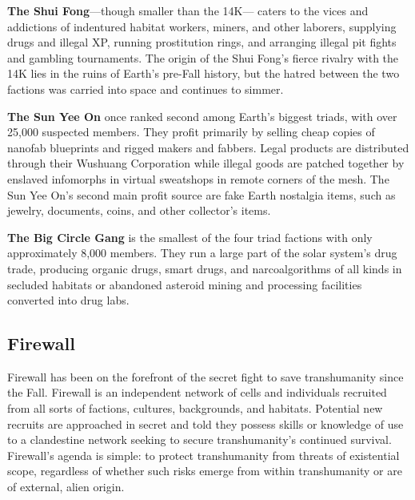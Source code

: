 \textbf{The Shui Fong}—though smaller than the 14K—
caters to the vices and addictions of indentured 
habitat workers, miners, and other laborers, supplying 
drugs and illegal XP, running prostitution rings, and 
arranging illegal pit fights and gambling tournaments. 
The origin of the Shui Fong's fierce rivalry with the 
14K lies in the ruins of Earth's pre-Fall history, but 
the hatred between the two factions was carried into 
space and continues to simmer.

\textbf{The Sun Yee On} once ranked second among Earth's 
biggest triads, with over 25,000 suspected members. 
They profit primarily by selling cheap copies of nanofab
blueprints and rigged makers and fabbers. Legal
products are distributed through their Wushuang Corporation
while illegal goods are patched together by
enslaved infomorphs in virtual sweatshops in remote 
corners of the mesh. The Sun Yee On's second main 
profit source are fake Earth nostalgia items, such as 
jewelry, documents, coins, and other collector's items.

\textbf{The Big Circle Gang} is the smallest of the four triad 
factions with only approximately 8,000 members. 
They run a large part of the solar system's drug trade, 
producing organic drugs, smart drugs, and narcoalgorithms
of all kinds in secluded habitats or abandoned
asteroid mining and processing facilities converted 
into drug labs.

\subsection{Firewall}

Firewall has been on the forefront of the secret fight 
to save transhumanity since the Fall. Firewall is an independent
network of cells and individuals recruited
from all sorts of factions, cultures, backgrounds, 
and habitats. Potential new recruits are approached 
in secret and told they possess skills or knowledge 
of use to a clandestine network seeking to secure 
transhumanity's continued survival. Firewall's agenda 
is simple: to protect transhumanity from threats of 
existential scope, regardless of whether such risks 
emerge from within transhumanity or are of external, 
alien origin.

